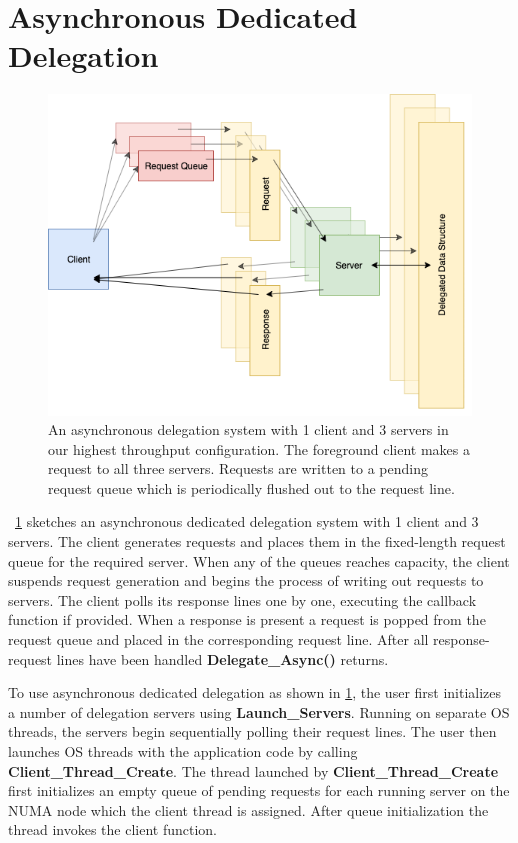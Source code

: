 \documentclass{uicthesi}
\begin{document}
\section{Asynchronous Dedicated Delegation}
\begin{figure}[ht!]
\centering
\includegraphics[width=0.9\columnwidth]{FIG/dedicated_async.png}
\caption{An asynchronous delegation system with 1 client and 3 servers in our highest throughput configuration. The foreground client makes a request to all three servers. Requests are written to a pending request queue which is periodically flushed out to the request line. }
\label{fig:dedicated_delegation}
\end{figure}

~\ref{fig:dedicated_delegation} sketches an asynchronous dedicated delegation system with 1 client and 3 servers. The client generates requests and places them in the fixed-length request queue for the required server. When any of the queues reaches capacity, the client suspends request generation and begins the process of writing out requests to servers. The client polls its response lines one by one, executing the callback function if provided. When a response is present a request is popped from the request queue and placed in the corresponding request line. After all response-request lines have been handled \textbf{Delegate\_Async()} returns. 

To use asynchronous dedicated delegation as shown in \ref{fig:dedicated_delegation}, the user first initializes a number of delegation servers using \textbf{Launch\_Servers}. Running on separate OS threads, the servers begin sequentially polling their request lines. The user then launches OS threads with the application code by calling \textbf{Client\_Thread\_Create}. The thread launched by \textbf{Client\_Thread\_Create} first initializes an empty queue of pending requests for each running server on the NUMA node which the client thread is assigned. After queue initialization the thread invokes the client function. 
\end{document}
